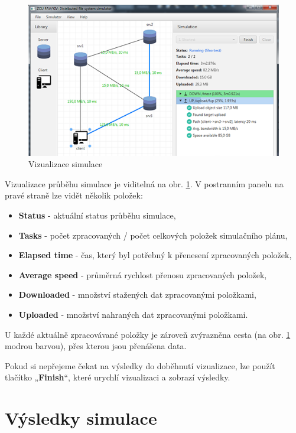 \documentclass[czech,DP]{thesiskiv}
\begin{document}
\begin{figure}
\centering
	\includegraphics{img/prirucka/prubeh_vizualizace_simulace.png}
\caption{Vizualizace simulace}
\label{fig:p_prubeh_vizualizace_simulace}
\end{figure}

Vizualizace průběhu simulace je viditelná na obr. \ref{fig:p_prubeh_vizualizace_simulace}. V postranním panelu na pravé straně lze vidět několik položek:

\begin{itemize}
\item \textbf{Status} - aktuální status průběhu simulace,
\item \textbf{Tasks} - počet zpracovaných / počet celkových položek simulačního plánu,
\item \textbf{Elapsed time} - čas, který byl potřebný k přenesení zpracovaných položek,
\item \textbf{Average speed} - průměrná rychlost přenosu zpracovaných položek,
\item \textbf{Downloaded} - množství stažených dat zpracovanými položkami,
\item \textbf{Uploaded} - množství nahraných dat zpracovanými položkami.
\end{itemize}

\noindent U každé aktuálně zpracovávané položky je zároveň zvýrazněna cesta (na obr. \ref{fig:p_prubeh_vizualizace_simulace} modrou barvou), přes kterou jsou přenášena data.

Pokud si nepřejeme čekat na výsledky do doběhnutí vizualizace, lze použít tlačítko „\textbf{Finish}“, které urychlí vizualizaci a zobrazí výsledky.

\section{Výsledky simulace}
\end{document}
